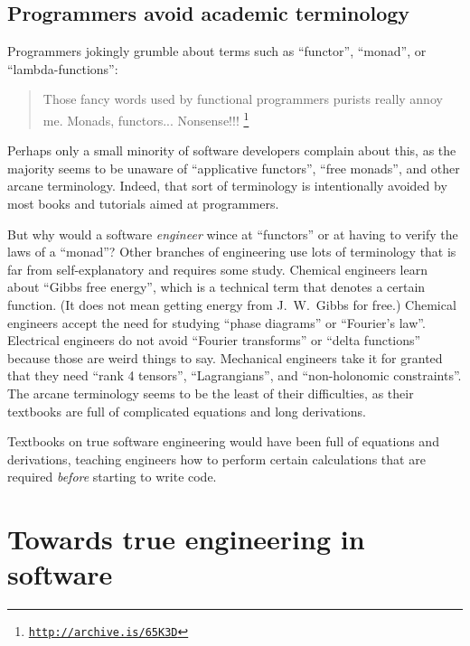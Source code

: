 \subsection{Programmers avoid academic terminology }

Programmers jokingly grumble about terms such as \textsf{``}functor\textsf{''}, \textsf{``}monad\textsf{''},
or \textsf{``}lambda-functions\textsf{''}:
\begin{quote}
{\small{}Those fancy words used by functional programmers purists
really annoy me. Monads, functors... Nonsense!!! }\footnote{\texttt{\href{http://archive.is/65K3D}{http://archive.is/65K3D}}}
\end{quote}
Perhaps only a small minority of software developers complain about
this, as the majority seems to be unaware of \textsf{``}applicative functors\textsf{''},
\textsf{``}free monads\textsf{''}, and other arcane terminology. Indeed, that sort
of terminology is intentionally avoided by most books and tutorials
aimed at programmers.

But why would a software \emph{engineer} wince at \textsf{``}functors\textsf{''} or
at having to verify the laws of a \textsf{``}monad\textsf{''}? Other branches of engineering
use lots of terminology that is far from self-explanatory and requires
some study. Chemical engineers learn about \textsf{``}Gibbs free energy\textsf{''},
which is a technical term that denotes a certain function. (It does
not mean getting energy from J.~W.~Gibbs
for free.) Chemical engineers accept the need for studying \textsf{``}phase
diagrams\textsf{''} or \textsf{``}Fourier\textsf{'}s law\textsf{''}. Electrical engineers do not avoid
\textsf{``}Fourier transforms\textsf{''} or \textsf{``}delta functions\textsf{''} because those are
weird things to say. Mechanical engineers take it for granted that
they need \textsf{``}rank 4 tensors\textsf{''}, \textsf{``}Lagrangians\textsf{''}, and \textsf{``}non-holonomic
constraints\textsf{''}. The arcane terminology seems to be the least of their
difficulties, as their textbooks are full of complicated equations
and long derivations.

Textbooks on true software engineering would have been full of equations
and derivations, teaching engineers how to perform certain calculations
that are required \emph{before} starting to write code.

\section{Towards true engineering in software}

